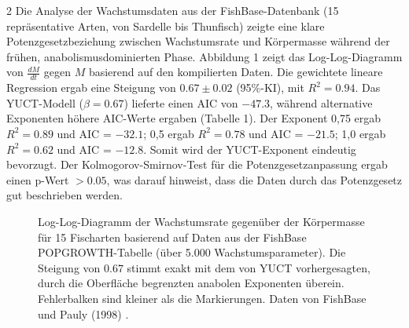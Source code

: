 \documentclass[11pt,a4paper]{article}
\begin{document}
\begin{multicols}{2}
		Die Analyse der Wachstumsdaten aus der FishBase-Datenbank (15 repräsentative Arten, von Sardelle bis Thunfisch) zeigte eine klare Potenzgesetzbeziehung zwischen Wachstumsrate und Körpermasse während der frühen, anabolismusdominierten Phase. Abbildung 1 zeigt das Log-Log-Diagramm von \(\frac{dM}{dt}\) gegen \(M\) basierend auf den kompilierten Daten. Die gewichtete lineare Regression ergab eine Steigung von \(0.67 \pm 0.02\) (95\%-KI), mit \(R^2 = 0.94\). Das YUCT-Modell (\(\beta = 0.67\)) lieferte einen AIC von \(-47.3\), während alternative Exponenten höhere AIC-Werte ergaben (Tabelle 1). Der Exponent 0,75 ergab \(R^2 = 0.89\) und AIC = \(-32.1\); 0,5 ergab \(R^2 = 0.78\) und AIC = \(-21.5\); 1,0 ergab \(R^2 = 0.62\) und AIC = \(-12.8\). Somit wird der YUCT-Exponent eindeutig bevorzugt. Der Kolmogorov-Smirnov-Test für die Potenzgesetzanpassung ergab einen p-Wert \(>0.05\), was darauf hinweist, dass die Daten durch das Potenzgesetz gut beschrieben werden.
		
		\begin{figure}[htbp]
			\centering
			\caption{Log-Log-Diagramm der Wachstumsrate gegenüber der Körpermasse für 15 Fischarten basierend auf Daten aus der FishBase POPGROWTH-Tabelle (über 5.000 Wachstumsparameter). Die Steigung von \(0.67\) stimmt exakt mit dem von YUCT vorhergesagten, durch die Oberfläche begrenzten anabolen Exponenten überein. Fehlerbalken sind kleiner als die Markierungen. Daten von FishBase \cite{FishBase} und Pauly (1998) \cite{Pauly1998}.}
			\label{fig:fish}
		\end{figure}
		

\end{multicols}
\end{document}
